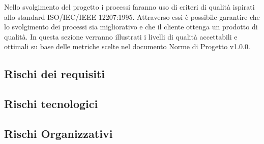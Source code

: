 \documentclass[../piano_di_qualifica.tex]{subfiles}
\begin{document}
Nello svolgimento del progetto i processi faranno uso di criteri di qualità ispirati allo standard ISO/IEC/IEEE 12207:1995. Attraverso essi è possibile garantire che lo svolgimento dei processi sia migliorativo e che il cliente ottenga un prodotto di qualità. In questa sezione verranno illustrati i livelli di qualità accettabili e ottimali su base delle metriche scelte nel documento Norme di Progetto v1.0.0.


\subsection{Rischi dei requisiti}%
\label{sub:rischi_req}


\subsection{Rischi tecnologici}%
\label{sub:rischi_tec}



\subsection{Rischi Organizzativi}%
\label{sub:rischi_org}
\end{document}
